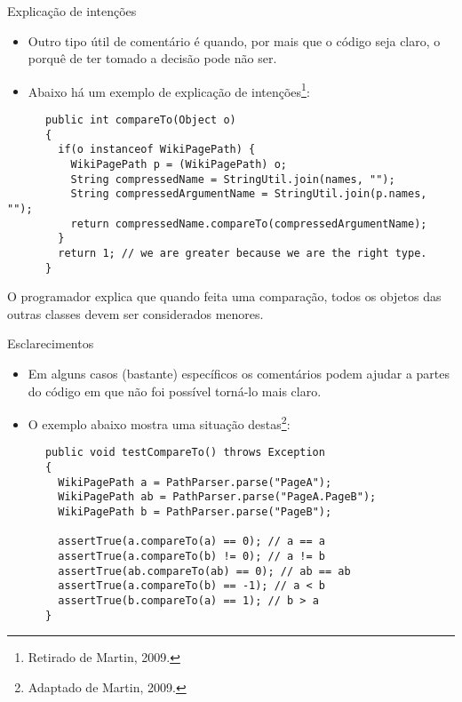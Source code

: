 \documentclass[11pt]{beamer}
\begin{document}
  \begin{frame}[fragile]{Explicação de intenções}
    \begin{itemize}
      \item Outro tipo útil de comentário é quando, por mais que o código seja claro, o porquê de ter tomado a decisão pode não ser.
      \item Abaixo há um exemplo de explicação de intenções\footnote{Retirado de Martin, 2009.}:
    \end{itemize}
    \begin{lstlisting}
      public int compareTo(Object o)
      {
        if(o instanceof WikiPagePath) {
          WikiPagePath p = (WikiPagePath) o;
          String compressedName = StringUtil.join(names, "");
          String compressedArgumentName = StringUtil.join(p.names, "");
          return compressedName.compareTo(compressedArgumentName);
        }
        return 1; // we are greater because we are the right type.
      }
    \end{lstlisting}
    O programador explica que quando feita uma comparação, todos os objetos das outras classes devem ser considerados menores.
  \end{frame}

  \begin{frame}[fragile]{Esclarecimentos}
    \begin{itemize}
      \item Em alguns casos (bastante) específicos os comentários podem ajudar a partes do código em que não foi possível torná-lo mais claro.
      \item O exemplo abaixo mostra uma situação destas\footnote{Adaptado de Martin, 2009.}:
    \end{itemize}
    \begin{lstlisting}
      public void testCompareTo() throws Exception
      {
        WikiPagePath a = PathParser.parse("PageA");
        WikiPagePath ab = PathParser.parse("PageA.PageB");
        WikiPagePath b = PathParser.parse("PageB");
        
        assertTrue(a.compareTo(a) == 0); // a == a
        assertTrue(a.compareTo(b) != 0); // a != b
        assertTrue(ab.compareTo(ab) == 0); // ab == ab
        assertTrue(a.compareTo(b) == -1); // a < b
        assertTrue(b.compareTo(a) == 1); // b > a
      }
    \end{lstlisting}
  \end{frame}
\end{document}

